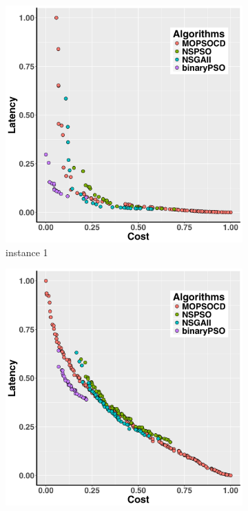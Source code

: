 \documentclass[10pt,journal,compsoc]{IEEEtran}
\begin{document}
\begin{figure}[ht]
   \centering
   \begin{subfigure}{0.21\linewidth}
       \includegraphics[width=\textwidth]{pics/total1.png}
    \caption{instance 1}
   \end{subfigure}
   \begin{subfigure}{0.21\linewidth}
       \includegraphics[width=\textwidth]{pics/total2.png}

\end{subfigure}
\end{figure}
\end{document}

